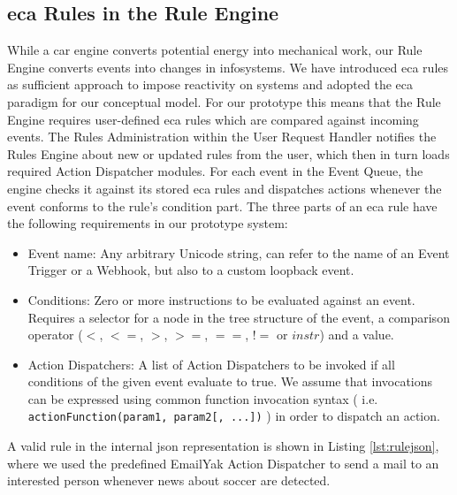 \subsection{\acrshort{eca} Rules in the Rule Engine}
While a car engine converts potential energy into mechanical work, our \textrm{Rule Engine} converts events into changes in \textrm{\glspl{infosystem}}.
We have introduced \textrm{\acrshort{eca}} rules as sufficient approach to impose reactivity on systems and adopted the \textrm{\acrshort{eca}} paradigm for our conceptual model.
For our prototype this means that the \textrm{Rule Engine} requires user-defined \textrm{\acrshort{eca}} rules which are compared against incoming events.
The \textrm{Rules Administration} within the \textrm{User Request Handler} notifies the \textrm{Rules Engine} about new or updated rules from the user, which then in turn loads required \textrm{Action Dispatcher} modules.
For each event in the \textrm{Event Queue}, the engine checks it against its stored \textrm{\acrshort{eca}} rules and dispatches actions whenever the event conforms to the rule's condition part.
The three parts of an \textrm{\acrshort{eca}} rule have the following requirements in our prototype system:
\begin{itemize}
	\item Event name: Any arbitrary Unicode string, can refer to the name of an \textrm{Event Trigger} or a \textrm{Webhook}, but also to a custom loopback event.
	\item Conditions: Zero or more instructions to be evaluated against an event. Requires a selector for a node in the tree structure of the event, a comparison operator ($<$, $<=$, $>$, $>=$, $==$, $!=$ or $instr$) and a value.
	\item Action Dispatchers: A list of \textrm{Action Dispatchers} to be invoked if all conditions of the given event evaluate to true. We assume that invocations can be expressed using common function invocation syntax ( i.e. \texttt{actionFunction(param1, param2[, ...])} ) in order to dispatch an action.
\end{itemize}
A valid rule in the internal \textrm{\acrshort{json}} representation is shown in Listing \ref{lst:rulejson}, where we used the predefined \textrm{EmailYak Action Dispatcher} to send a mail to an interested person whenever news about soccer are detected.

